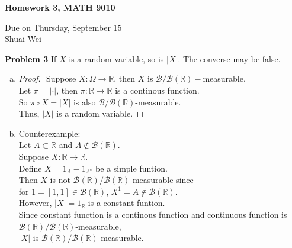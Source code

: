 \documentclass{article}
\newcommand{\llb}{\mathcal{B}}
\newcommand{\bbr}{\mathbb{R}}
\begin{document}
\begin{center}

\textbf{Homework 3, MATH 9010}

Due on Thursday, September 15\\

Shuai Wei

\end{center}

\vspace{3 mm}

\noindent \textbf{Problem 3} If $X$ is a random variable, so is $|X|$. The converse may be false.\\

\begin{enumerate}[(a)]
	\item
		\begin{proof}
			$ $\newline
			Suppose $X: \Omega\to \bbr$, then $X$ is $\llb/\llb(\bbr)-$measurable. \\
			Let $\pi = |\cdot|$, then $\pi: \bbr \to \bbr$ is a continous function.\\
			So $\pi\circ X = |X|$ is also $\llb/\llb(\bbr)$-measurable. \\
			Thus, $|X|$ is a random variable. 
		\end{proof}
	\item Counterexample:\\
		Let $A \subset \bbr$ and $A \not\in \llb(\bbr)$.\\
		Suppose $X:\bbr \to \bbr$.\\
		Define $X = 1_A - 1_{A^c}$ be a simple funtion.\\
		Then $X$ is not $\llb(\bbr)/\llb(\bbr)$-measurable since \\
		for $1 = [1,1] \in \llb(\bbr)$, $X^{1} = A \not\in \llb(\bbr)$.\\
		However, $|X| = 1_{\bbr}$ is a constant funtion. \\
		Since constant function is a continous function and continuous function is $\llb(\bbr)/\llb(\bbr)$-measurable,\\
		$|X|$ is $\llb(\bbr)/\llb(\bbr)$-measurable.


\end{enumerate}
\end{document}
